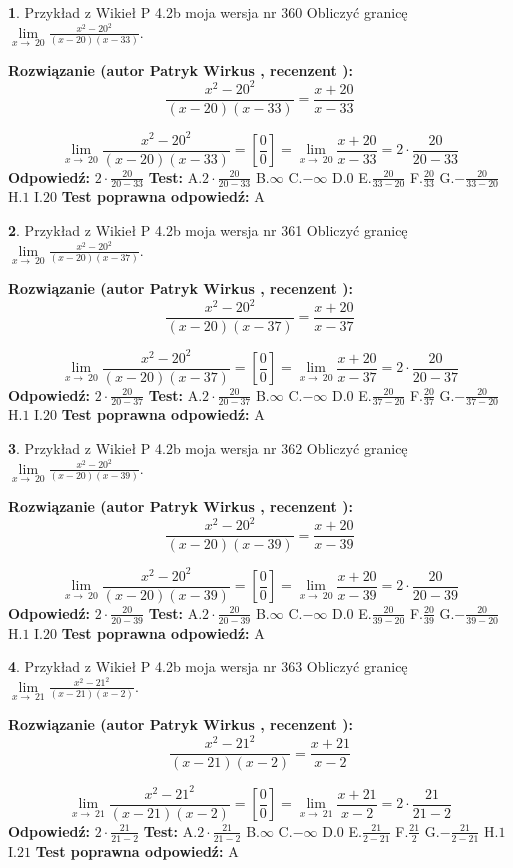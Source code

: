 \documentclass[12pt, a4paper]{article}
\theoremstyle{definition} %
\newtheorem{zad}{}
\newcommand{\zadStart}[1]{\begin{zad}#1\newline}
\newcommand{\zadStop}{\end{zad}}
\newcommand{\rozwStart}[2]{\noindent \textbf{Rozwiązanie (autor #1 , recenzent #2): }\newline}
\newcommand{\rozwStop}{\newline}
\newcommand{\odpStart}{\noindent \textbf{Odpowiedź:}\newline}
\newcommand{\odpStop}{\newline}
\newcommand{\testStart}{\noindent \textbf{Test:}\newline}
\newcommand{\testStop}{\newline}
\newcommand{\kluczStart}{\noindent \textbf{Test poprawna odpowiedź:}\newline}
\newcommand{\kluczStop}{\newline}
\begin{document}
\zadStart{Przykład z Wikieł P 4.2b moja wersja nr 360}
Obliczyć granicę $\lim\limits_{x\to\ 20}\frac{x^{2}-20^{2}}{(x-20)(x-33)}$.
\zadStop
\rozwStart{Patryk Wirkus}{}
$$\frac{x^{2}-20^{2}}{(x-20)(x-33)}=\frac{x+20}{x-33}$$

$$\lim\limits_{x\to\ 20}\frac{x^{2}-20^{2}}{(x-20)(x-33)}=[\frac{0}{0}]=\lim\limits_{x\to\ 20}\frac{x+20}{x-33}=2 \cdot \frac{20}{20-33}$$
\rozwStop
\odpStart
$2 \cdot \frac{20}{20-33}$
\odpStop
\testStart
A.$2 \cdot \frac{20}{20-33}$
B.$\infty$
C.$-\infty$
D.$0$
E.$\frac{20}{33-20}$
F.$\frac{20}{33}$
G.$-\frac{20}{33-20}$
H.$1$
I.$20$
\testStop
\kluczStart
A
\kluczStop



\zadStart{Przykład z Wikieł P 4.2b moja wersja nr 361}
Obliczyć granicę $\lim\limits_{x\to\ 20}\frac{x^{2}-20^{2}}{(x-20)(x-37)}$.
\zadStop
\rozwStart{Patryk Wirkus}{}
$$\frac{x^{2}-20^{2}}{(x-20)(x-37)}=\frac{x+20}{x-37}$$

$$\lim\limits_{x\to\ 20}\frac{x^{2}-20^{2}}{(x-20)(x-37)}=[\frac{0}{0}]=\lim\limits_{x\to\ 20}\frac{x+20}{x-37}=2 \cdot \frac{20}{20-37}$$
\rozwStop
\odpStart
$2 \cdot \frac{20}{20-37}$
\odpStop
\testStart
A.$2 \cdot \frac{20}{20-37}$
B.$\infty$
C.$-\infty$
D.$0$
E.$\frac{20}{37-20}$
F.$\frac{20}{37}$
G.$-\frac{20}{37-20}$
H.$1$
I.$20$
\testStop
\kluczStart
A
\kluczStop



\zadStart{Przykład z Wikieł P 4.2b moja wersja nr 362}
Obliczyć granicę $\lim\limits_{x\to\ 20}\frac{x^{2}-20^{2}}{(x-20)(x-39)}$.
\zadStop
\rozwStart{Patryk Wirkus}{}
$$\frac{x^{2}-20^{2}}{(x-20)(x-39)}=\frac{x+20}{x-39}$$

$$\lim\limits_{x\to\ 20}\frac{x^{2}-20^{2}}{(x-20)(x-39)}=[\frac{0}{0}]=\lim\limits_{x\to\ 20}\frac{x+20}{x-39}=2 \cdot \frac{20}{20-39}$$
\rozwStop
\odpStart
$2 \cdot \frac{20}{20-39}$
\odpStop
\testStart
A.$2 \cdot \frac{20}{20-39}$
B.$\infty$
C.$-\infty$
D.$0$
E.$\frac{20}{39-20}$
F.$\frac{20}{39}$
G.$-\frac{20}{39-20}$
H.$1$
I.$20$
\testStop
\kluczStart
A
\kluczStop



\zadStart{Przykład z Wikieł P 4.2b moja wersja nr 363}
Obliczyć granicę $\lim\limits_{x\to\ 21}\frac{x^{2}-21^{2}}{(x-21)(x-2)}$.
\zadStop
\rozwStart{Patryk Wirkus}{}
$$\frac{x^{2}-21^{2}}{(x-21)(x-2)}=\frac{x+21}{x-2}$$

$$\lim\limits_{x\to\ 21}\frac{x^{2}-21^{2}}{(x-21)(x-2)}=[\frac{0}{0}]=\lim\limits_{x\to\ 21}\frac{x+21}{x-2}=2 \cdot \frac{21}{21-2}$$
\rozwStop
\odpStart
$2 \cdot \frac{21}{21-2}$
\odpStop
\testStart
A.$2 \cdot \frac{21}{21-2}$
B.$\infty$
C.$-\infty$
D.$0$
E.$\frac{21}{2-21}$
F.$\frac{21}{2}$
G.$-\frac{21}{2-21}$
H.$1$
I.$21$
\testStop
\kluczStart
A
\kluczStop
\end{document}
